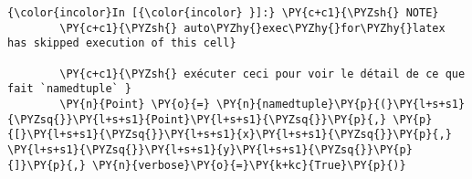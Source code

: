     \begin{Verbatim}[commandchars=\\\{\}]
{\color{incolor}In [{\color{incolor} }]:} \PY{c+c1}{\PYZsh{} NOTE}
        \PY{c+c1}{\PYZsh{} auto\PYZhy{}exec\PYZhy{}for\PYZhy{}latex has skipped execution of this cell}
        
        \PY{c+c1}{\PYZsh{} exécuter ceci pour voir le détail de ce que fait `namedtuple` }
        \PY{n}{Point} \PY{o}{=} \PY{n}{namedtuple}\PY{p}{(}\PY{l+s+s1}{\PYZsq{}}\PY{l+s+s1}{Point}\PY{l+s+s1}{\PYZsq{}}\PY{p}{,} \PY{p}{[}\PY{l+s+s1}{\PYZsq{}}\PY{l+s+s1}{x}\PY{l+s+s1}{\PYZsq{}}\PY{p}{,} \PY{l+s+s1}{\PYZsq{}}\PY{l+s+s1}{y}\PY{l+s+s1}{\PYZsq{}}\PY{p}{]}\PY{p}{,} \PY{n}{verbose}\PY{o}{=}\PY{k+kc}{True}\PY{p}{)}
\end{Verbatim}



    
    
    
